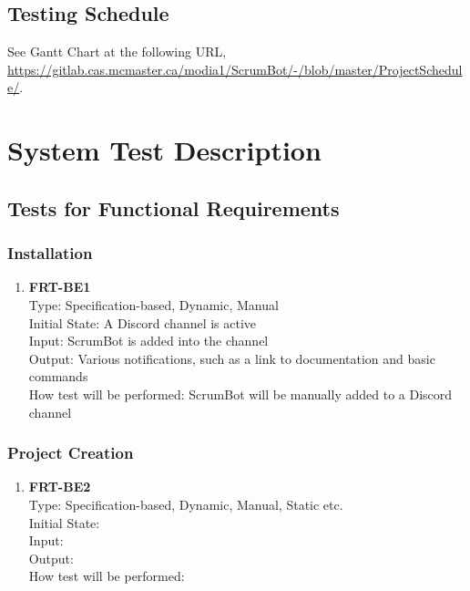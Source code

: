 \documentclass[12pt, titlepage]{article}
\begin{document}
\subsection{Testing Schedule}
See Gantt Chart at the following URL, \url{https://gitlab.cas.mcmaster.ca/modia1/ScrumBot/-/blob/master/ProjectSchedule/}.

\section{System Test Description}
\subsection{Tests for Functional Requirements}

\subsubsection{Installation}

\begin{enumerate}
    \item{\textbf{FRT-BE1}}\\
    Type: Specification-based, Dynamic, Manual\\
    Initial State: A Discord channel is active\\
    Input: ScrumBot is added into the channel\\
    Output: Various notifications, such as a link to documentation and basic commands\\
    How test will be performed: ScrumBot will be manually added to a Discord channel\\
\end{enumerate}

\subsubsection{Project Creation}

\begin{enumerate}
    \item{\textbf{FRT-BE2}}\\
    Type: Specification-based, Dynamic, Manual, Static etc.\\
    Initial State: \\
    Input: \\
    Output: \\
    How test will be performed: \\
\end{enumerate}
\end{document}
